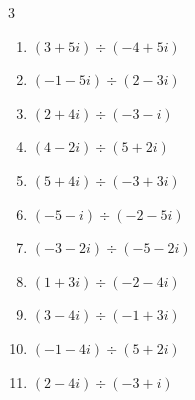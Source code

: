 \begin{multicols}{3}
\begin{enumerate}

  \item $\displaystyle (3+5i)\div(-4+5i)$


  \item $\displaystyle (-1-5i)\div(2-3i)$

        \phantom{$\displaystyle =1-i$}

  \item $\displaystyle (2+4i)\div(-3-i)$

        \phantom{$\displaystyle =-1-i$}

\columnbreak %

\resetques

  \item $\displaystyle (4-2i)\div(5+2i)$


  \item $\displaystyle (5+4i)\div(-3+3i)$


  \item $\displaystyle (-5-i)\div(-2-5i)$


  \item $\displaystyle (-3-2i)\div(-5-2i)$


  \item $\displaystyle (1+3i)\div(-2-4i)$


  \item $\displaystyle (3-4i)\div(-1+3i)$


  \item $\displaystyle (-1-4i)\div(5+2i)$


  \item $\displaystyle (2-4i)\div(-3+i)$

        \phantom{$\displaystyle =-1+i$}


\end{enumerate}
\end{multicols}
